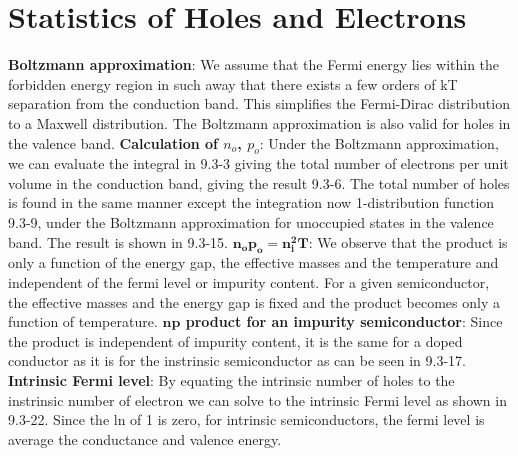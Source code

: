 \documentclass{article}
\numberwithin{equation}{section}
\begin{document}
\section*{Statistics of Holes and Electrons}
\textbf{Boltzmann approximation}: We assume that the Fermi energy lies within the forbidden energy region in such away that there exists a few orders of kT separation from the conduction band. This simplifies the Fermi-Dirac distribution to a Maxwell distribution. The Boltzmann approximation is also valid for holes in the valence band.
\newline
\textbf{Calculation of $n_o$, $p_o$}: Under the Boltzmann approximation, we can evaluate the integral in 9.3-3 giving the total number of electrons per unit volume in the conduction band, giving the result 9.3-6. The total number of holes is found in the same manner except the integration now 1-distribution function 9.3-9, under the Boltzmann approximation for unoccupied states in the valence band. The result is shown in 9.3-15.
\newline
\textbf{$\mathbf{n_op_o=n_i^2T}$}: We observe that the product is only a function of the energy gap, the effective masses and the temperature and independent of the fermi level or impurity content. For a given semiconductor, the effective masses and the energy gap is fixed and the product becomes only a function of temperature.
\newline
\textbf{$\mathbf{np}$ product for an impurity semiconductor}: Since the product is independent of impurity content, it is the same for a doped conductor as it is for the instrinsic semiconductor as can be seen in 9.3-17.
\newline
\textbf{Intrinsic Fermi level}: By equating the intrinsic number of holes to the instrinsic number of electron we can solve to the intrinsic Fermi level as shown in 9.3-22. Since the ln of 1 is zero, for intrinsic semiconductors, the fermi level is average the conductance and valence energy.
\newline
\end{document}
